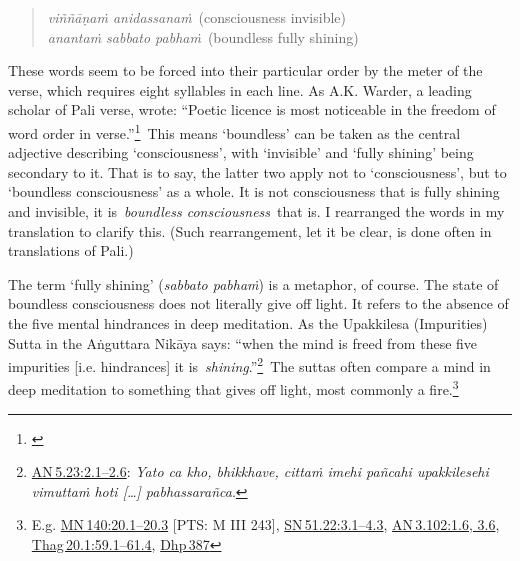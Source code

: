 \documentclass[10pt, openright]{book}
\begin{document}
\begin{quote}


\begin{itemize}

\textit{viññāṇaṁ anidassanaṁ} (consciousness invisible) \\ \textit{anantaṁ sabbato pabhaṁ} (boundless fully shining)

\end{itemize}

\end{quote}
These words seem to be forced into their particular order by the meter of the verse, which requires eight syllables in each line. As A.K. Warder, a leading scholar of Pali verse, wrote: “Poetic licence is most noticeable in the freedom of word order in verse.”\footnote {\cite{Warder}} This means ‘boundless’ can be taken as the central adjective describing ‘consciousness’, with ‘invisible’ and ‘fully shining’ being secondary to it. That is to say, the latter two apply not to ‘consciousness’, but to ‘boundless consciousness’ as a whole. It is not consciousness that is fully shining and invisible, it is \textit{boundless consciousness} that is. I rearranged the words in my translation to clarify this. (Such rearrangement, let it be clear, is done often in translations of Pali.)


The term ‘fully shining’ (\textit{sabbato pabhaṁ}) is a metaphor, of course. The state of boundless consciousness does not literally give off light. It refers to the absence of the five mental hindrances in deep meditation. As the Upakkilesa (Impurities) Sutta in the Aṅguttara Nikāya says: “when the mind is freed from these five impurities [i.e. hindrances] it is \textit{shining}.”\footnote {\href{https://suttacentral.net/an5.23/en/sujato\#2.1}{AN 5.23:2.1–2.6}: \textit{Yato ca kho, bhikkhave, cittaṁ imehi pañcahi upakkilesehi vimuttaṁ hoti […] pabhassarañca}.} The suttas often compare a mind in deep meditation to something that gives off light, most commonly a fire.\footnote {E.g. \href{https://suttacentral.net/mn140/en/sujato\#20.1}{MN 140:20.1–20.3} [PTS: M III 243], \href{https://suttacentral.net/sn51.22/en/sujato\#3.1}{SN 51.22:3.1–4.3}, \href{https://suttacentral.net/an3.102/en/sujato\#1.6}{AN 3.102:1.6, 3.6}, \href{https://suttacentral.net/thag20.1/en/sujato\#59.1}{Thag 20.1:59.1–61.4}, \href{https://suttacentral.net/dhp387/en/sujato}{Dhp 387}}
\end{document}
